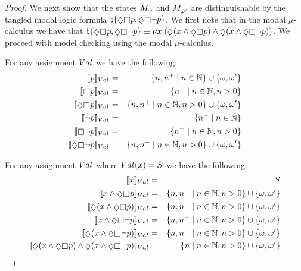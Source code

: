 \begin{proof}
We next show that the states $\kPModel{\omega}$ and $\kPModel{\omega'}$ are distinguishable by the tangled modal logic formula $\tangle \{\possible \necessary \atomP, \possible \necessary \neg \atomP\}$.
We first note that in the modal $\mu$-calculus we have that $\tangle \{\possible \necessary \atomP, \possible \necessary \neg \atomP\} \equiv \gfp{\varX} (\possible (\varX \land \possible \necessary \atomP) \land \possible (\varX \land \possible \necessary \neg \atomP))$.
We proceed with model checking using the modal $\mu$-calculus.

For any assignment $\kAssignment$ we have the following:
\begin{eqnarray*}
    \interpretation[\kAssignment]{\atomP} &=& \{n, n^+ \mid n \in \naturals\} \cup \{\omega, \omega'\}\\
    \interpretation[\kAssignment]{\necessary \atomP} &=& \{n^+ \mid n \in \naturals, n > 0\}\\
    \interpretation[\kAssignment]{\possible \necessary \atomP} &=& \{n, n^+ \mid n \in \naturals, n > 0\} \cup \{\omega, \omega'\}\\
    \interpretation[\kAssignment]{\neg \atomP} &=& \{n^- \mid n \in \naturals\}\\
    \interpretation[\kAssignment]{\necessary \neg \atomP} &=& \{n^- \mid n \in \naturals, n > 0\}\\
    \interpretation[\kAssignment]{\possible \necessary \neg \atomP} &=& \{n, n^- \mid n \in \naturals, n > 0\} \cup \{\omega, \omega'\}
\end{eqnarray*}

For any assignment $\kAssignment$ where $\kAssignment(\varX) = \kStates$ we have the following:
\begin{eqnarray*}
    \interpretation[\kAssignment]{\varX} &=& \kStates\\
    \interpretation[\kAssignment]{\varX \land \possible \necessary \atomP} &=& \{n, n^+ \mid n \in \naturals, n > 0\} \cup \{\omega, \omega'\}\\
    \interpretation[\kAssignment]{\possible (\varX \land \possible \necessary \atomP)} &=& \{n, n^+ \mid n \in \naturals, n > 0\} \cup \{\omega, \omega'\}\\
    \interpretation[\kAssignment]{\varX \land \possible \necessary \neg \atomP} &=& \{n, n^- \mid n \in \naturals, n > 0\} \cup \{\omega, \omega'\}\\
    \interpretation[\kAssignment]{\possible (\varX \land \possible \necessary \neg \atomP)} &=& \{n, n^- \mid n \in \naturals, n > 0\} \cup \{\omega, \omega'\}\\
    \interpretation[\kAssignment]{\possible (\varX \land \possible \necessary \atomP) \land \possible (\varX \land \possible \necessary \neg \atomP)} &=& \{n \mid n \in \naturals, n > 0\} \cup \{\omega, \omega'\}
\end{eqnarray*}


\end{proof}
